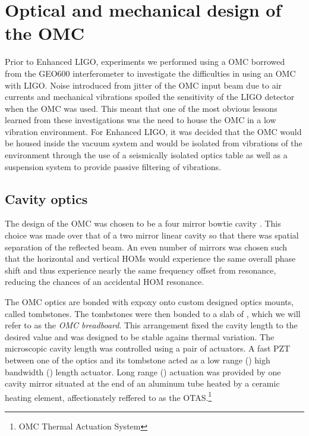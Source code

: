 \section{Optical and mechanical design of the OMC}
Prior to Enhanced LIGO, experiments we performed using a OMC borrowed from the GEO600 interferometer to investigate the difficulties in using an OMC with LIGO. %
Noise introduced from jitter of the OMC input beam due to air currents and mechanical vibrations spoiled the sensitivity of the LIGO detector when the OMC was used. %
This meant that one of the most obvious lessons learned from these investigations was the need to house the OMC in a low vibration environment. %
For Enhanced LIGO, it was decided that the OMC would be housed inside the vacuum system and would be isolated from vibrations of the environment through the use of a seismically isolated optics table as well as a suspension system to provide passive filtering of vibrations.

\subsection{Cavity optics}
The design of the OMC was chosen to be a four mirror bowtie cavity . %
This choice was made over that of a two mirror linear cavity so that there was spatial separation of the reflected beam. %
An even number of mirrors was chosen such that the horizontal and vertical HOMs would experience the same overall phase shift and thus experience nearly the same frequency offset from resonance, reducing the chances of an accidental HOM resonance.

The OMC optics are bonded with  expoxy onto custom designed  optics mounts, called tombstones. %
The tombstones were then bonded to a slab of , which we will refer to as the \emph{OMC breadboard}. %
This arrangement fixed the cavity length to the desired value and was designed to be stable agains thermal variation. %
The microscopic cavity length was controlled using a pair of actuators. %
A fast PZT between one of the optics and its tombstone acted as a low range () high bandwidth () length actuator. %
Long range () actuation was provided by one cavity mirror situated at the end of an aluminum tube heated by a ceramic heating element, affectionately reffered to as the OTAS.\footnote{OMC Thermal Actuation System}


